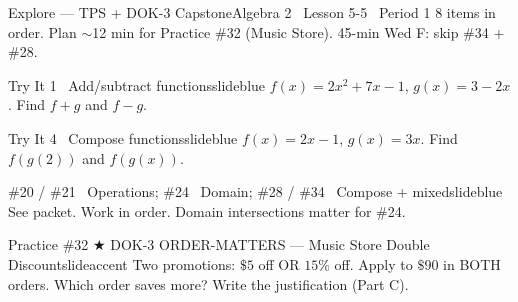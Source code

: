 \documentclass[aspectratio=169, 11pt]{beamer}
\begin{document}
\begin{frame}{Explore --- TPS + DOK-3 Capstone}{Algebra 2 \textperiodcentered\ Lesson 5-5 \textperiodcentered\ Period 1}
\small\textcolor{slidegray}{8 items in order. Plan \(\sim\)12 min for Practice \#32 (Music Store). 45-min Wed F: skip \#34 + \#28.}

\vspace{0.1cm}
\begin{projcard}{Try It 1 \textperiodcentered\ Add/subtract functions}{slideblue}
\(f(x)=2x^2+7x-1\), \(g(x)=3-2x\). Find \(f+g\) and \(f-g\).
\end{projcard}
\vspace{-0.12cm}
\begin{projcard}{Try It 4 \textperiodcentered\ Compose functions}{slideblue}
\(f(x)=2x-1\), \(g(x)=3x\). Find \(f(g(2))\) and \(f(g(x))\).
\end{projcard}
\vspace{-0.12cm}
\begin{projcard}{\#20 / \#21 \textperiodcentered\ Operations; \quad \#24 \textperiodcentered\ Domain; \quad \#28 / \#34 \textperiodcentered\ Compose + mixed}{slideblue}
\small See packet. Work in order. Domain intersections matter for \#24.
\end{projcard}
\vspace{-0.12cm}
\begin{projcard}{Practice \#32 \(\bigstar\) DOK-3 ORDER-MATTERS --- Music Store Double Discount}{slideaccent}
\small Two promotions: \(\$5\) off OR \(15\%\) off. Apply to \(\$90\) in BOTH orders. Which order saves more? Write the justification (Part C).
\end{projcard}
\end{frame}
\end{document}
